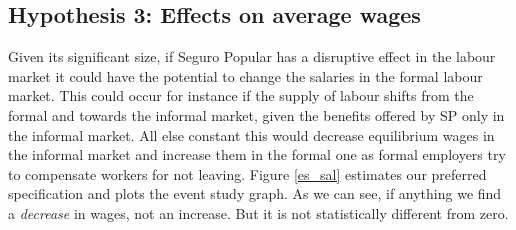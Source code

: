 \documentclass[oneside,11pt]{article}
\begin{document}
\vspace{.2in}


\subsection{Hypothesis 3: Effects on average wages}

Given its significant size, if Seguro Popular has a disruptive effect in the labour market it could have the potential to change the salaries in the formal labour market. This could occur for instance if the supply of labour shifts from the formal and towards the informal market, given the benefits offered by SP only in the informal market. All else constant this would decrease equilibrium wages in the informal market and increase them in the formal one as formal employers try to compensate workers for not leaving.  Figure \ref{es_sal} estimates our preferred specification and plots the event study graph. As we can see, if anything we find a \textit{decrease} in wages, not an increase. But it is not statistically different from zero. 
\end{document}
